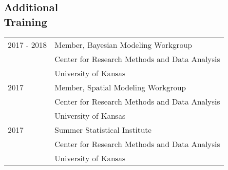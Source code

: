 \documentclass[margin,line,pifont,palatino,courier]{res}
\begin{document}
\begin{resume}
\section{\sc Additional\\ Training}

\begin{tabular}{@{}p{0.8in}p{4in}}
  2017 - 2018   & Member, Bayesian Modeling Workgroup\\
            & Center for Research Methods and Data Analysis\\
            & University of Kansas\\
  2017      & Member, Spatial Modeling Workgroup\\
            & Center for Research Methods and Data Analysis\\
            & University of Kansas\\
  2017      & Summer Statistical Institute\\
            & Center for Research Methods and Data Analysis\\
            & University of Kansas\\
\end{tabular}








\end{resume}
\end{document}
